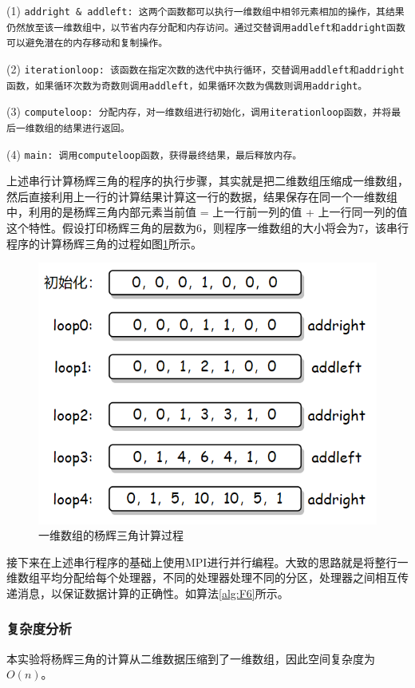 \documentclass[supercite]{Experimental_Report}
\theoremstyle{definition}
\begin{document}
(1) \texttt{addright \& addleft: 这两个函数都可以执行一维数组中相邻元素相加的操作，其结果仍然放至该一维数组中，以节省内存分配和内存访问。通过交替调用addleft和addright函数可以避免潜在的内存移动和复制操作。}

(2) \texttt{iterationloop: 该函数在指定次数的迭代中执行循环，交替调用addleft和addright函数，如果循环次数为奇数则调用addleft，如果循环次数为偶数则调用addright。}

(3) \texttt{computeloop: 分配内存，对一维数组进行初始化，调用iterationloop函数，并将最后一维数组的结果进行返回。}

(4) \texttt{main: 调用computeloop函数，获得最终结果，最后释放内存。}

上述串行计算杨辉三角的程序的执行步骤，其实就是把二维数组压缩成一维数组，然后直接利用上一行的计算结果计算这一行的数据，结果保存在同一个一维数组中，利用的是杨辉三角内部元素当前值 = 上一行前一列的值 + 上一行同一列的值这个特性。假设打印杨辉三角的层数为6，则程序一维数组的大小将会为7，该串行程序的计算杨辉三角的过程如图\ref{fig:p4}所示。

\begin{figure}[ht]
\centering
\includegraphics[scale=0.8]{杨辉三角01.png}
\caption{一维数组的杨辉三角计算过程}
\label{fig:p4}
\end{figure}

接下来在上述串行程序的基础上使用MPI进行并行编程。大致的思路就是将整行一维数组平均分配给每个处理器，不同的处理器处理不同的分区，处理器之间相互传递消息，以保证数据计算的正确性。如算法\ref{alg:F6}所示。

\subsubsection{复杂度分析}
本实验将杨辉三角的计算从二维数据压缩到了一维数组，因此空间复杂度为$O(n)$。
\end{document}
